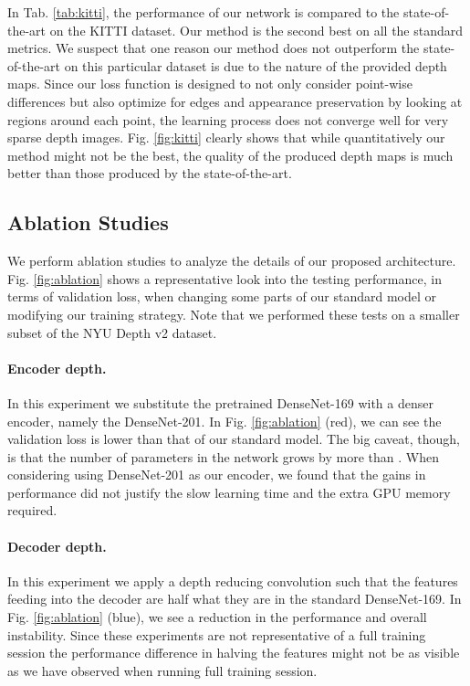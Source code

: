 \documentclass[10pt,twocolumn,letterpaper]{article}
\begin{document}
In Tab. \ref{tab:kitti}, the performance of our network is compared to the state-of-the-art on the KITTI dataset. Our method is the second best on all the standard metrics. We suspect that one reason our method does not outperform the state-of-the-art on this particular dataset is due to the nature of the provided depth maps. Since our loss function is designed to not only consider point-wise differences but also optimize for edges and appearance preservation by looking at regions around each point, the learning process does not converge well for very sparse depth images. Fig. \ref{fig:kitti} clearly shows that while quantitatively our method might not be the best, the quality of the produced depth maps is much better than those produced by the state-of-the-art.    




\subsection{Ablation Studies}

We perform ablation studies to analyze the details of our proposed architecture. Fig. \ref{fig:ablation} shows a representative look into the testing performance, in terms of validation loss, when changing some parts of our standard model or modifying our training strategy. Note that we performed these tests on a smaller subset of the NYU Depth v2 dataset.

\paragraph{Encoder depth.} In this experiment we substitute the pretrained DenseNet-169 with a denser encoder, namely the DenseNet-201. In Fig. \ref{fig:ablation} (red), we can see the validation loss is lower than that of our standard model. The big caveat, though, is that the number of parameters in the network grows by more than . When considering using DenseNet-201 as our encoder, we found that the gains in performance did not justify the slow learning time and the extra GPU memory required.

\paragraph{Decoder depth.} In this experiment we apply a depth reducing convolution such that the features feeding into the decoder are half what they are in the standard DenseNet-169. In Fig. \ref{fig:ablation} (blue), we see a reduction in the performance and overall instability. Since these experiments are not representative of a full training session the performance difference in halving the features might not be as visible as we have observed when running full training session.
\end{document}
